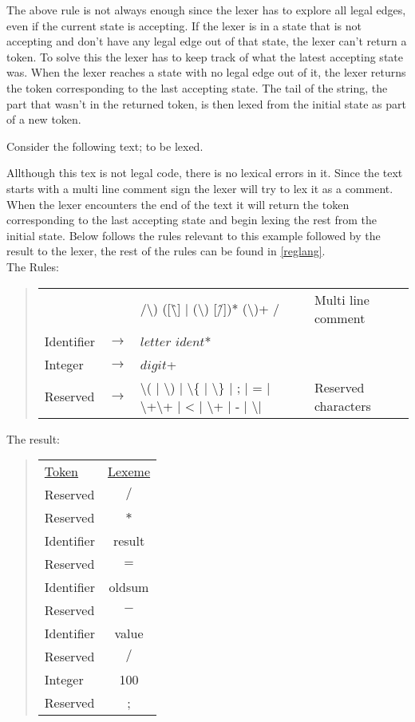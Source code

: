 The above rule is not always enough since the lexer has to explore all legal
edges, even if the current state is accepting. If the lexer is in a state that
is not accepting and don't have any legal edge out of that state, the lexer
can't return a token. To solve this the lexer has to keep track of what the
latest accepting state was. When the lexer reaches a state with no
legal edge out of it, the lexer returns the token corresponding to the last
accepting state. The tail of the string, the part that wasn't in the returned
token, is then lexed from the initial state as part of a new token.\cite{Aho2006}
\begin{example}
Consider the following text; to be lexed.
\begin{quote}

\end{quote}
Allthough this tex is not legal code, there is no lexical errors in it. Since
the text starts with a multi line comment sign the lexer will try to lex it as
a comment. When the lexer encounters the end of the text it will return the
token corresponding to the last accepting state and begin lexing the rest from
the initial state. Below follows the rules relevant to this example followed by
the result to the lexer, the rest of the rules can be found in \cref{reglang}.\\
The Rules:
\begin{quote}
\begin{tabular}{l c l l}
& & /\textbackslash*) ([\^\textbackslash*] | (\textbackslash*) [\^/])*
    (\textbackslash*)+ / & Multi line comment\\
Identifier & $\rightarrow$ & $letter$ $ident$*\\
Integer    & $\rightarrow$ & $digit$+\\
Reserved   & $\rightarrow$ & \textbackslash( | \textbackslash) | \textbackslash\{
                         | \textbackslash\} | ; | = | \textbackslash+\textbackslash+
                         | < | \textbackslash+ | - | \textbackslash* | \/ & Reserved characters\\
\end{tabular}
\end{quote}
The result:
\begin{quote}
\begin{tabular}{l c}
\underline{Token} & \underline{Lexeme}\\
Reserved & $/$\\
Reserved & $*$\\
Identifier & result\\
Reserved & $=$\\
Identifier & oldsum\\
Reserved & $-$\\
Identifier & value\\
Reserved & $/$\\
Integer & 100\\
Reserved & ;
\end{tabular}
\end{quote}
\end{example}

